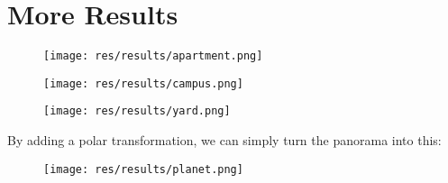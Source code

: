 
\section{More Results}
\begin{figure}[H]
  \centering
  \texttt{[image: res/results/apartment.png]}
\end{figure}
\begin{figure}[H]
  \centering
  \texttt{[image: res/results/campus.png]}
\end{figure}

\begin{figure}[H]
  \centering
  \texttt{[image: res/results/yard.png]}
\end{figure}



\newpage
By adding a polar transformation, we can simply turn the panorama into this:

\begin{figure}[H]
  \centering
  \texttt{[image: res/results/planet.png]}
\end{figure}
